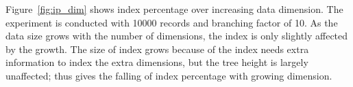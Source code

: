 Figure~\ref{fig:ip_dim} shows index percentage over increasing data
dimension. The experiment is conducted with 10000 records and branching
factor of 10. As the data size grows with the number of dimensions, the
index is only slightly affected by the growth. The size of index grows
because of the index needs extra information to index the extra
dimensions, but the tree height is largely unaffected; thus gives the
falling of index percentage with growing dimension.


